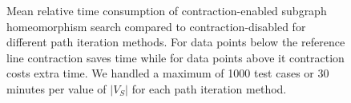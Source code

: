 \begin{figure}
\begin{subfigure} {0.5\linewidth}

\end{subfigure}

\caption{Mean relative time consumption of contraction-enabled subgraph homeomorphism search compared to contraction-disabled for different path iteration methods. For data points below the reference line contraction saves time while for data points above it contraction costs extra time. We handled a maximum of 1000 test cases or 30 minutes per value of $|V_S|$ for each path iteration method.}	
\label{fig:contraction-performance}
\end{figure}
